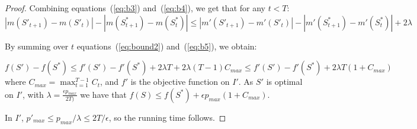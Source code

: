 \documentclass[a4paper]{book}
\newtheorem{proof}{\noindent{\bf Proof.} }
\begin{document}
\begin{proof}
Combining equations~(\ref{eq:b3}) and~(\ref{eq:b4}), we get that for any $t<T$:
\begin{equation}\label{eq:b5}
    |m(S'_{t+1})-m(S'_t)|-|m(S^*_{t+1})-m(S^*_t)| \leq |m'(S'_{t+1})-m'(S'_t)|-|m'(S^*_{t+1})-m'(S^*_t)|+2\lambda 
\end{equation}

By summing over $t$ equations~(\ref{eq:bound2}) and~(\ref{eq:b5}), we obtain:

\begin{equation}\label{eq:b6}
    f(S')-f(S^*)\leq f'(S')-f'(S^*)+2\lambda T+2\lambda (T-1)C_{max}\leq f'(S')-f'(S^*)+2\lambda T(1+C_{max})  
\end{equation}
where $C_{max}=\max_{t=1}^{T-1}C_t$, and $f'$ is the objective function on $I'$. As $S'$ is optimal on $I'$, with $\lambda=\frac{\epsilon p_{max}}{2T)}$ we have that $f(S)\leq f(S^*)+\epsilon p_{max}(1+C_{max})$.

In $I'$, $p'_{max}\leq p_{max}/\lambda\leq 2T/\epsilon$, so the running time follows.
\end{proof}




\end{document}
